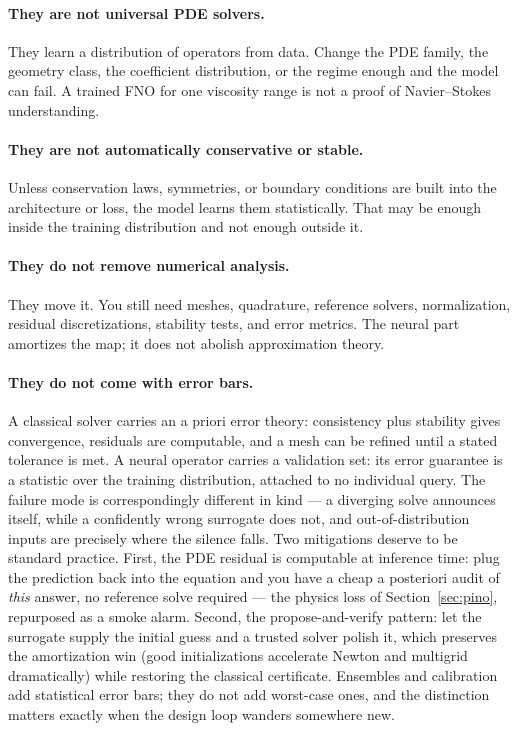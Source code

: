 \documentclass[10pt,a4paper]{article}
\begin{document}
\paragraph{They are not universal PDE solvers.}
They learn a distribution of operators from data. Change the PDE family, the
geometry class, the coefficient distribution, or the regime enough and the
model can fail. A trained FNO for one viscosity range is not a proof of
Navier--Stokes understanding.

\paragraph{They are not automatically conservative or stable.}
Unless conservation laws, symmetries, or boundary conditions are built into
the architecture or loss, the model learns them statistically. That may be
enough inside the training distribution and not enough outside it.

\paragraph{They do not remove numerical analysis.}
They move it. You still need meshes, quadrature, reference solvers,
normalization, residual discretizations, stability tests, and error metrics.
The neural part amortizes the map; it does not abolish approximation theory.

\paragraph{They do not come with error bars.}
A classical solver carries an a priori error theory: consistency plus
stability gives convergence, residuals are computable, and a mesh can be
refined until a stated tolerance is met. A neural operator carries a
validation set: its error guarantee is a statistic over the training
distribution, attached to no individual query. The failure mode is
correspondingly different in kind --- a diverging solve announces itself,
while a confidently wrong surrogate does not, and out-of-distribution
inputs are precisely where the silence falls. Two mitigations deserve to
be standard practice. First, the PDE residual is computable at inference
time: plug the prediction back into the equation and you have a cheap a
posteriori audit of \emph{this} answer, no reference solve required ---
the physics loss of Section~\ref{sec:pino}, repurposed as a smoke alarm.
Second, the propose-and-verify pattern: let the surrogate supply the
initial guess and a trusted solver polish it, which preserves the
amortization win (good initializations accelerate Newton and multigrid
dramatically) while restoring the classical certificate. Ensembles and
calibration add statistical error bars; they do not add worst-case ones,
and the distinction matters exactly when the design loop wanders
somewhere new.
\end{document}

